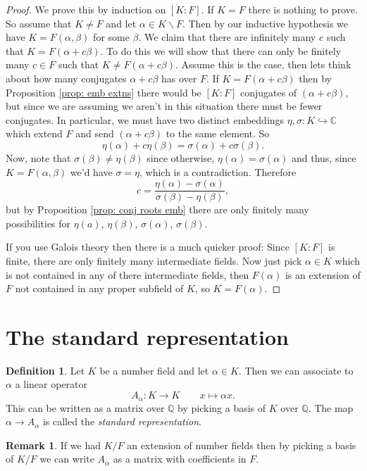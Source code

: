 \documentclass[11pt,a4paper]{report}
\theoremstyle{plain}
\theoremstyle{definition}
\newtheorem{defn}[subsection]{Definition}
\theoremstyle{definition}
\newtheorem{rmrk}[subsection]{Remark}
\def\CC{\mathbb{C}}
\def\QQ{\mathbb{Q}}
\def \a{\alpha}
\def \lra{\longrightarrow}
\begin{document}
	\begin{proof}
		We prove this by induction on $[K:F]$. If $K=F$ there is nothing to prove. So assume that $K \neq F$ and let $\a \in K \backslash F$. Then by our inductive hypothesis we have $K=F(\a,\beta)$ for some $\beta$. We claim that there are infinitely many $c$ such that $K=F(\a+c\beta)$. To do this we will show that there can only be finitely many $c \in F$ such that $K \neq F(\a+c\beta)$. Assume this is the case, then lets think about how many conjugates $\a+c\beta$ has over $F$. If $K =F(\a+c\beta)$ then by Proposition \ref{prop: emb extns} there would be $[K:F]$ conjugates of $(\a+c\beta)$, but since we are assuming we aren't in this situation there must be fewer conjugates. In particular, we must have two distinct embeddings $\eta,\sigma: K \hookrightarrow \CC$ which extend $F$ and send $(\a+c\beta)$ to the same element. So \[\eta(\a)+c\eta(\beta)=\sigma(\a)+c\sigma(\beta).\] Now, note that $\sigma(\beta) \neq \eta(\beta)$ since otherwise, $\eta(\a)=\sigma(\a)$ and thus, since $K=F(\a,\beta)$ we'd have $\sigma=\eta$, which is a contradiction. Therefore \[c=\frac{\eta(\a)-\sigma(\a)}{\sigma(\beta)-\eta(\beta)},\] but by Proposition \ref{prop: conj roots emb}  there are only finitely many possibilities for $\eta(a)$, $\eta(\beta)$, $\sigma(\a)$, $\sigma(\beta)$.
		
		If you use Galois theory then there is a much quicker proof: Since $[K:F]$ is finite, there are only finitely many intermediate fields. Now just pick $\a \in K$ which is not contained in any of there intermediate fields, then $F(\a)$ is an extension of $F$ not contained in any proper subfield of $K$, so $K=F(\a)$.
	\end{proof}
	
	
	
	
	\section{The standard representation}
	
	\begin{defn}
		Let $K$ be a number field and let $\a \in K$. Then  we can associate to $\a$ a linear operator \[A_\a: K \lra K \qquad x \mapsto \a x.\] This can be written as a matrix over $\QQ$ by picking a basis of $K$ over $\QQ$. The map $\a \to A_\a$ is called the \textit{standard representation}.
	\end{defn}
	
	\begin{rmrk}
		If we had $K/F$ an extension of number fields then by picking a basis of $K/F$ we can write $A_\a$ as a matrix with coefficients in $F$.
	\end{rmrk}
	
\end{document}
